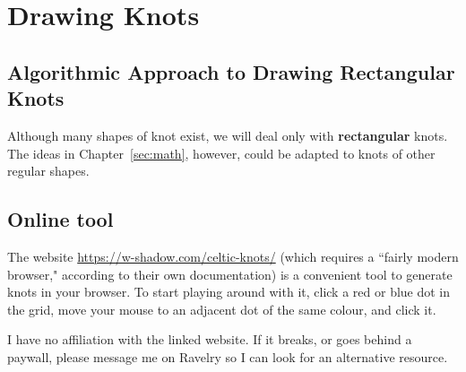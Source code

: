 \documentclass[openany]{book}
\begin{document}
\chapter{Drawing Knots}\label{sec:making}
\section{Algorithmic Approach to Drawing Rectangular Knots}
Although many shapes of knot exist, we will deal only with \textbf{rectangular} knots. The ideas in Chapter~\ref{sec:math}, however, could be adapted to knots of other regular shapes.

\section*{Online tool}
The website \url{https://w-shadow.com/celtic-knots/} (which requires a ``fairly modern browser," according to their own documentation) is a convenient tool to generate knots in your browser. To start playing around with it, click a red or blue dot in the grid, move your mouse to an adjacent dot of the same colour, and click it.

I have no affiliation with the linked website. If it breaks, or goes behind a paywall, please message me on Ravelry so I can look for an alternative resource.
\end{document}
